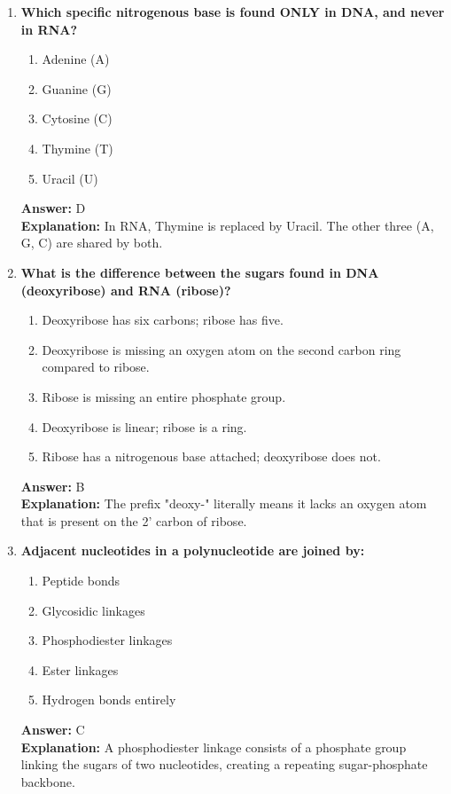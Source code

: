 \documentclass[11pt, a4paper]{article}
\begin{document}
\begin{enumerate}
\item \textbf{Which specific nitrogenous base is found ONLY in DNA, and never in RNA?}
\begin{enumerate}[label=\Alph*.]
    \item Adenine (A)
    \item Guanine (G)
    \item Cytosine (C)
    \item Thymine (T)
    \item Uracil (U)
\end{enumerate}
\textbf{Answer:} D \\
\textbf{Explanation:} In RNA, Thymine is replaced by Uracil. The other three (A, G, C) are shared by both.

\item \textbf{What is the difference between the sugars found in DNA (deoxyribose) and RNA (ribose)?}
\begin{enumerate}[label=\Alph*.]
    \item Deoxyribose has six carbons; ribose has five.
    \item Deoxyribose is missing an oxygen atom on the second carbon ring compared to ribose.
    \item Ribose is missing an entire phosphate group.
    \item Deoxyribose is linear; ribose is a ring.
    \item Ribose has a nitrogenous base attached; deoxyribose does not.
\end{enumerate}
\textbf{Answer:} B \\
\textbf{Explanation:} The prefix "deoxy-" literally means it lacks an oxygen atom that is present on the 2' carbon of ribose.

\item \textbf{Adjacent nucleotides in a polynucleotide are joined by:}
\begin{enumerate}[label=\Alph*.]
    \item Peptide bonds
    \item Glycosidic linkages
    \item Phosphodiester linkages
    \item Ester linkages
    \item Hydrogen bonds entirely
\end{enumerate}
\textbf{Answer:} C \\
\textbf{Explanation:} A phosphodiester linkage consists of a phosphate group linking the sugars of two nucleotides, creating a repeating sugar-phosphate backbone.


\end{enumerate}
\end{document}
